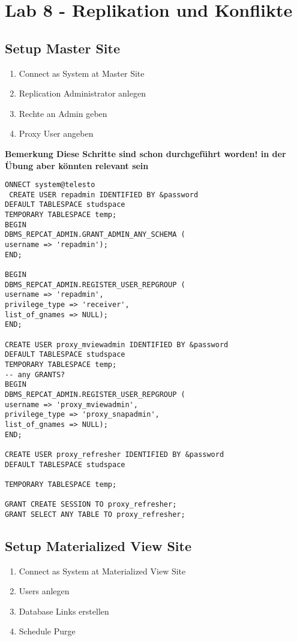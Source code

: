 \documentclass[a4paper,10pt,titlepage=false]{scrreprt}
\begin{document}
\chapter{Lab 8 - Replikation und Konflikte}

\section{Setup Master Site} %
\label{sec:setup_master_site}
\begin{enumerate}
  \item Connect as System at Master Site
  \item Replication Administrator anlegen
  \item Rechte an Admin geben
  \item Proxy User angeben
\end{enumerate}

\textbf{Bemerkung
Diese Schritte sind schon durchgeführt worden! in der Übung aber könnten relevant sein}

\begin{lstlisting}[style=sql,title=Master Site Setup]
  ONNECT system@telesto
 CREATE USER repadmin IDENTIFIED BY &password
DEFAULT TABLESPACE studspace
TEMPORARY TABLESPACE temp;
BEGIN
DBMS_REPCAT_ADMIN.GRANT_ADMIN_ANY_SCHEMA (
username => 'repadmin');
END;

BEGIN
DBMS_REPCAT_ADMIN.REGISTER_USER_REPGROUP (
username => 'repadmin',
privilege_type => 'receiver',
list_of_gnames => NULL);
END;

CREATE USER proxy_mviewadmin IDENTIFIED BY &password
DEFAULT TABLESPACE studspace
TEMPORARY TABLESPACE temp;
-- any GRANTS?
BEGIN
DBMS_REPCAT_ADMIN.REGISTER_USER_REPGROUP (
username => 'proxy_mviewadmin',
privilege_type => 'proxy_snapadmin',
list_of_gnames => NULL);
END;

CREATE USER proxy_refresher IDENTIFIED BY &password
DEFAULT TABLESPACE studspace

TEMPORARY TABLESPACE temp;

GRANT CREATE SESSION TO proxy_refresher;
GRANT SELECT ANY TABLE TO proxy_refresher;
\end{lstlisting}

\section{Setup Materialized View Site} %
\label{sec:setup_materialized_view_site}
\begin{enumerate}
  \item  Connect as System at Materialized View Site
\item Users anlegen
\item  Database Links erstellen
\item  Schedule Purge
\end{enumerate}
\end{document}
